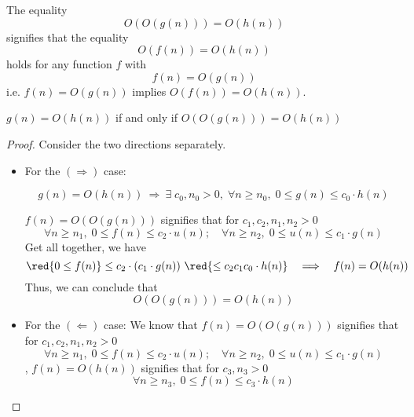 \begin{definition}
    The equality \[
        O(O(g(n))) = O(h(n))
    \]
    signifies that the equality
    \[
        O(f(n)) = O(h(n))
    \]
    holds for any function $f$ with \[
        f(n) = O(g(n))
    \]
    i.e. $f(n) = O(g(n))$ implies $O(f(n)) = O(h(n))$.
\end{definition}

\begin{theorem}
    $g(n) = O(h(n))$ if and only if $O(O(g(n))) = O(h(n))$
\end{theorem}
\begin{proof}
    Consider the two directions separately.
    \begin{itemize}
        \item For the $(\Rightarrow)$ case: 
        \begin{prev}
            \[
            g(n) = O(h(n)) \ \Longrightarrow \ \exists \; c_0, n_0 > 0, \; \forall n \geq n_0, \; 0 \leq g(n) \leq c_0 \cdot h(n)
            \]
        \end{prev}
        \(f(n) = O(O(g(n)))\) signifies that for \( c_1, c_2, n_1, n_2 > 0 \)
        \[
            \forall n \geq n_1, \; 0 \leq f(n) \leq c_2 \cdot u(n); \quad \forall n \geq n_2, \; 0 \leq u(n) \leq c_1 \cdot g(n)
        \]
        Get all together, we have
        \[
            \red{0 \leq f(n)} \leq c_2 \cdot (c_1 \cdot g(n))\  \red{\leq c_2 c_1 c_0 \cdot h(n)} \quad \Longrightarrow \quad f(n) = O(h(n))
        \]
        Thus, we can conclude that \[
            O(O(g(n))) = O(h(n))
        \]

        \item {} For the $(\Leftarrow)$ case: We know that 
        \(f(n) = O(O(g(n)))\) signifies that for \( c_1, c_2, n_1, n_2 > 0 \)
        \[
            \forall n \geq n_1, \; 0 \leq f(n) \leq c_2 \cdot u(n); \quad \forall n \geq n_2, \; 0 \leq u(n) \leq c_1 \cdot g(n)
        \]
        , \( f(n) = O(h(n)) \) signifies that for \( c_3, n_3 > 0 \)
        \[
            \forall n \geq n_3, \; 0 \leq f(n) \leq c_3 \cdot h(n)
        \]
    \end{itemize}
\end{proof}

